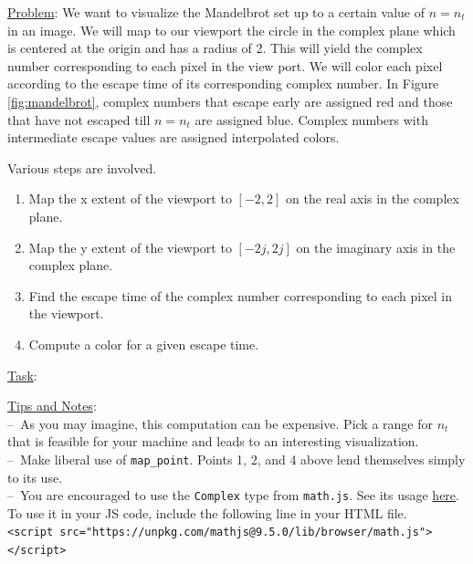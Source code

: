 \documentclass[addpoints]{exam}
\begin{document}
\begin{questions}
  \underline{Problem}: We want to visualize the Mandelbrot set up to a certain value of $n=n_t$ in an image. We will map to our viewport the circle in the complex plane which is centered at the origin and has a radius of 2. This will yield the complex number corresponding to each pixel in the view port. We will color each pixel according to the escape time of its corresponding complex number. In Figure \ref{fig:mandelbrot}, complex numbers that escape early are assigned red and those that have not escaped till $n=n_t$ are assigned blue. Complex numbers with intermediate escape values are assigned interpolated colors.

  Various steps are involved.
  \begin{enumerate}
  \item Map the x extent of the viewport to $[-2,2]$ on the real axis in the complex plane.
  \item Map the y extent of the viewport to $[-2j,2j]$ on the imaginary axis in the complex plane.
  \item Find the escape time of the complex number corresponding to each pixel in the viewport.
  \item Compute a color for a given escape time.
  \end{enumerate}

  \underline{Task}:
  \underline{Tips and Notes}:\\
  --\ As you may imagine, this computation can be expensive. Pick a range for $n_t$ that is feasible for your machine and leads to an interesting visualization.\\
  --\ Make liberal use of \texttt{map\_point}. Points 1, 2, and 4 above lend themselves simply to its use.\\
  --\ You are encouraged to use the \texttt{Complex} type from \texttt{math.js}. See its usage \href{https://mathjs.org/docs/datatypes/complex_numbers.html}{here}. To use it in your JS code, include the following line in your HTML file.\\
  \verb|<script src="https://unpkg.com/mathjs@9.5.0/lib/browser/math.js"></script>|


\end{questions}
\end{document}
